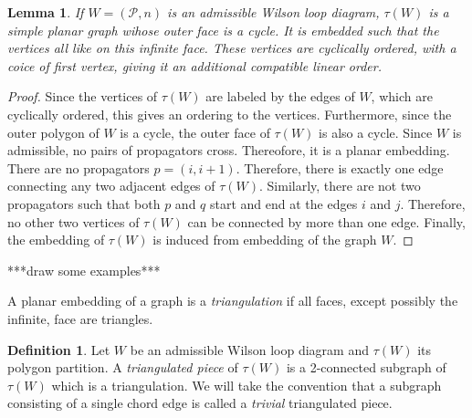\documentclass[11pt]{article}
\newcommand{\hlfix}[2]{\texthl{#1}\todo{#2}}
\newcommand{\cP}{\mathcal{P}}
\newtheorem{lem}[thm]{Lemma}
\theoremstyle{remark}
\theoremstyle{definition}
\newtheorem{dfn}[thm]{Definition}
\begin{document}
\begin{lem}\label{tausimpleplanarlem}
If $W = (\cP, n)$ is an admissible Wilson loop diagram, $\tau(W)$ is a simple planar graph wihose outer face is a cycle. It is embedded such that the vertices all like on this infinite face. These vertices are cyclically ordered, with a coice of first vertex, giving it an additional compatible linear order.
\end{lem}

\begin{proof}
Since the vertices of $\tau(W)$ are labeled by the edges of $W$, which are cyclically ordered, this gives an ordering to the vertices. Furthermore, since the outer polygon of $W$ is a cycle, the outer face of $\tau(W)$ is also a cycle. Since $W$ is admissible, no pairs of propagators cross. Thereofore, it is a planar embedding. There are no propagators $p = (i, i+1)$. Therefore, there is exactly one edge connecting any two adjacent edges of $\tau(W)$. Similarly, there are not two propagators such that both $p$ and $q$ start and end at the edges $i$ and $j$. Therefore, no other two vertices of $\tau(W)$ can be connected by more than one edge. Finally, the embedding of $\tau(W)$ is induced from embedding of the graph $W$.
 \end{proof}

***draw some examples***

A planar embedding of a graph is a \emph{triangulation} if all faces, except possibly the infinite, face are triangles.

\begin{dfn}
  Let $W$ be an admissible Wilson loop diagram and $\tau(W)$ its polygon partition. A \emph{triangulated piece} of $\tau(W)$ is a 2-connected subgraph of $\tau(W)$ which is a triangulation. We will take the convention that a subgraph consisting of a single chord edge is called a \emph{trivial} triangulated piece.
\end{dfn}
\end{document}
